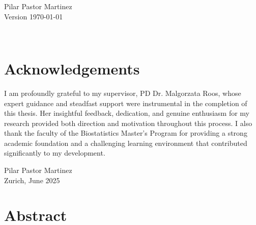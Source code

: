 \documentclass[11pt,a4paper,twoside]{book}
\begin{document}


\graphicspath{{./figure/}}
\setcounter{tocdepth}{1}

\thispagestyle{empty}
\begin{center}
  \vspace*{6cm}{\bfseries\Huge
  Frequentists and Bayesian methods to incorporate 
	recruitment rate stochasticity 
	at the design stage of a clinical trial
  }
  \vfill
  \rm

  \LARGE
  Pilar Pastor Martinez \\[12mm]
  
  \normalsize
  Version \today
\end{center}
\newpage
\thispagestyle{empty}~
\newpage
{}

\chapter*{Acknowledgements}
\thispagestyle{plain}

I am profoundly grateful to my supervisor, PD Dr. Malgorzata Roos, whose expert guidance and steadfast support were instrumental in the completion of this thesis. Her insightful feedback, dedication, and genuine enthusiasm for my research provided both direction and motivation throughout this process. I also thank the faculty of the Biostatistics Master's Program for providing a strong academic foundation and a challenging learning environment that contributed significantly to my development.

\bigskip

\begin{flushright}
  Pilar Pastor Martinez\\
  Zurich, June 2025
\end{flushright}



\thispagestyle{plain}
\tableofcontents
{}


\cleardoublepage
{}

\chapter*{Abstract}
\thispagestyle{plain}
\end{document}
